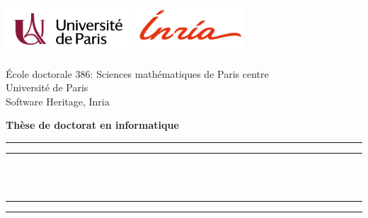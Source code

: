 \begin{titlingpage*}
\begin{SingleSpace}
\calccentering{\unitlength}

\includegraphics[height=1.8cm]{img/frontmatter/uni_paris.pdf}  \hfill
\includegraphics[height=1.8cm]{img/frontmatter/inria.png} \hfill
{}

\begin{center}
\begin{otherlanguage}{french}

    \textnormal{École doctorale 386: Sciences mathématiques de Paris centre}\\
\vspace{2mm}
\textnormal{Université de Paris}\\
\vspace{2mm}
\textnormal{Software Heritage, Inria}\\

\vspace{4mm}

\textnormal{\Large \textbf{Thèse de doctorat en informatique}}\\

\vspace*{2mm}

\rule[0.5ex]{\linewidth}{2pt}\vspace*{-\baselineskip}\vspace*{3.2pt}
\rule[0.5ex]{\linewidth}{1pt}\\[\baselineskip]
\vspace{-0.35cm}
{\huge \thetitle{}}\\
\rule[0.5ex]{\linewidth}{1pt}\vspace*{-\baselineskip}\vspace*{3.4pt}
\rule[0.5ex]{\linewidth}{2pt}\\


\end{otherlanguage}
\end{center}
\end{SingleSpace}
\end{titlingpage*}
